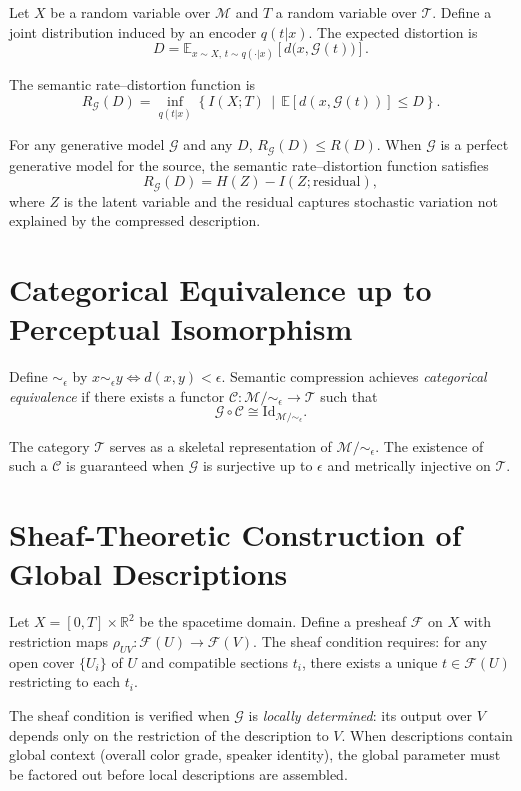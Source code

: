 \documentclass[11pt,a4paper]{article}
\theoremstyle{definition}
\theoremstyle{remark}
\begin{document}
Let $X$ be a random variable over $\mathcal{M}$ and $T$ a random variable over $\mathcal{T}$. Define a joint distribution induced by an encoder $q(t|x)$. The expected distortion is
\[
D = \mathbb{E}_{x \sim X, \, t \sim q(\cdot|x)} \left[ d\big(x, \mathcal{G}(t)\big) \right].
\]

The semantic rate--distortion function is
\[
R_{\mathcal{G}}(D) = \inf_{q(t|x)} \left\{ I(X;T) \,\middle|\, \mathbb{E}[d(x,\mathcal{G}(t))] \le D \right\}.
\]

For any generative model $\mathcal{G}$ and any $D$, $R_{\mathcal{G}}(D) \le R(D)$. When $\mathcal{G}$ is a perfect generative model for the source, the semantic rate--distortion function satisfies
\[
R_{\mathcal{G}}(D) = H(Z) - I(Z; \text{residual}),
\]
where $Z$ is the latent variable and the residual captures stochastic variation not explained by the compressed description.

\section{Categorical Equivalence up to Perceptual Isomorphism}
\label{app:equivalence}

Define $\sim_\epsilon$ by $x \sim_\epsilon y \iff d(x,y) < \epsilon$. Semantic compression achieves \emph{categorical equivalence} if there exists a functor $\mathcal{C} : \mathcal{M}/\!\sim_\epsilon \rightarrow \mathcal{T}$ such that
\[
\mathcal{G} \circ \mathcal{C} \cong \mathrm{Id}_{\mathcal{M}/\!\sim_\epsilon}.
\]

The category $\mathcal{T}$ serves as a skeletal representation of $\mathcal{M}/\!\sim_\epsilon$. The existence of such a $\mathcal{C}$ is guaranteed when $\mathcal{G}$ is surjective up to $\epsilon$ and metrically injective on $\mathcal{T}$.

\section{Sheaf-Theoretic Construction of Global Descriptions}
\label{app:sheaves}

Let $X = [0,T] \times \mathbb{R}^2$ be the spacetime domain. Define a presheaf $\mathcal{F}$ on $X$ with restriction maps $\rho_{UV} : \mathcal{F}(U) \to \mathcal{F}(V)$. The sheaf condition requires: for any open cover $\{U_i\}$ of $U$ and compatible sections $t_i$, there exists a unique $t \in \mathcal{F}(U)$ restricting to each $t_i$.

The sheaf condition is verified when $\mathcal{G}$ is \emph{locally determined}: its output over $V$ depends only on the restriction of the description to $V$. When descriptions contain global context (overall color grade, speaker identity), the global parameter must be factored out before local descriptions are assembled.
\end{document}
